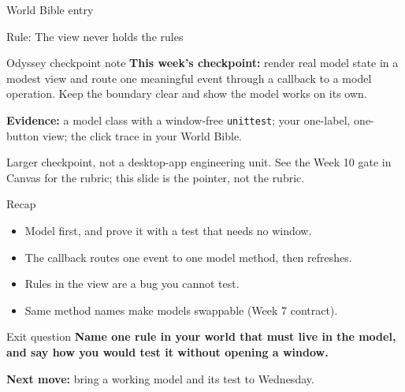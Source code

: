 \documentclass[aspectratio=169]{beamer}
\begin{document}
\begin{worldbibleframe}{World Bible entry}
  \begin{worldbibleentry}{Rule: The view never holds the rules}
  \end{worldbibleentry}
\end{worldbibleframe}

\begin{odysseygateframe}{Odyssey checkpoint note}
  \textbf{This week's checkpoint:} render real model state in a modest view and route one meaningful event through a callback to a model operation. Keep the boundary clear and show the model works on its own.

  \vspace{2mm}
  \textbf{Evidence:} a model class with a window-free \texttt{unittest}; your one-label, one-button view; the click trace in your World Bible.

  \vspace{2mm}
  \small Larger checkpoint, not a desktop-app engineering unit. See the Week 10 gate in Canvas for the rubric; this slide is the pointer, not the rubric.
\end{odysseygateframe}

\begin{recapframe}{Recap}
  \begin{itemize}
    \item Model first, and prove it with a test that needs no window.
    \item The callback routes one event to one model method, then refreshes.
    \item Rules in the view are a bug you cannot test.
    \item Same method names make models swappable (Week 7 contract).
  \end{itemize}
\end{recapframe}

\begin{exitframe}{Exit question}
  \Large\color{cs2primary}
  \textbf{Name one rule in your world that must live in the model, and say how you would test it without opening a window.}

  \vspace{4mm}
  \normalsize\normalfont\color{cs2ink}
  \textbf{Next move:} bring a working model and its test to Wednesday.
\end{exitframe}
\end{document}
